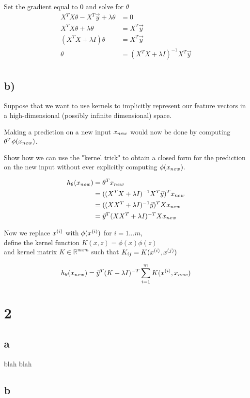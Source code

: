 \documentclass[11pt]{article}
\begin{document}
Set the gradient equal to $0$ and solve for $\theta$
\begin{align*}
  X^{T} X \theta - X^{T} \vec{y} + \lambda \theta &= 0 \\
  X^{T} X \theta + \lambda \theta &= X^{T} \vec{y} \\
  (X^{T} X + \lambda I) \theta &= X^{T} \vec{y} \\
  \theta &= (X^{T} X + \lambda I)^{-1} X^{T} \vec{y} \\
\end{align*}

\subsection*{b)}

Suppose that we want to use kernels to implicitly represent our feature vectors in a high-dimensional (possibly infinite dimensional) space. 

Making a prediction on a new input $x_{new}$ would now be done by computing $\theta^{T} \phi(x_{new})$.

Show how we can use the "kernel trick" to obtain a closed form for the prediction on the new input without ever explicitly computing $\phi(x_{new})$.

\begin{align*}
  h_{\theta}(x_{new}) &= \theta^{T} x_{new} \\
             &= ((X^{T} X + \lambda I)^{-1} X^{T} \vec{y})^{T} x_{new} \\
             &= ((X X^{T} + \lambda I)^{-1} \vec{y})^{T} X x_{new} \\
             &= \vec{y}^{T} (X X^{T} + \lambda I)^{-T} X x_{new} \\
\end{align*}

Now we replace $x^{(i)}$ with $\phi(x^{(i)})$ for $i = 1...m$,\\
define the kernel function $K(x, z) = \phi(x) \phi(z)$ \\
and kernel matrix $K \in \mathbb{R}^{m x m}$ such that $K_{ij} = K(x^{(i)}, x^{(j)})$

\begin{align*}
  h_{\theta}(x_{new}) &= \vec{y}^{T} (K + \lambda I)^{-T} \sum_{i=1}^{m} K(x^{(i)}, x_{new}) \\
\end{align*}
\section*{2}

\subsection*{a}

blah blah

\subsection*{b}
\end{document}
